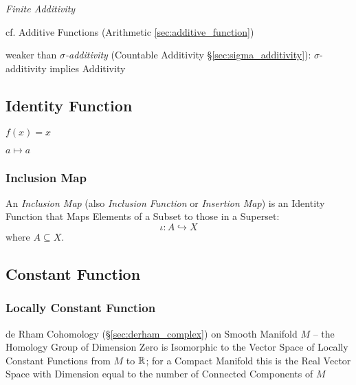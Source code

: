 \emph{Finite Additivity}

cf. Additive Functions (Arithmetic \ref{sec:additive_function})

weaker than \emph{$\sigma$-additivity} (Countable Additivity
\S\ref{sec:sigma_additivity}): $\sigma$-additivity implies Additivity



\subsection{Identity Function}\label{sec:identity_function}

$f(x) = x$

$a \mapsto a$



\subsubsection{Inclusion Map}\label{sec:inclusion_map}

An \emph{Inclusion Map} (also \emph{Inclusion Function} or \emph{Insertion Map})
is an Identity Function that Maps Elements of a Subset to those in a Superset:
\[
  \iota : A \hookrightarrow X
\]
where $A \subseteq X$.



\subsection{Constant Function}\label{sec:constant_function}

\subsubsection{Locally Constant Function}\label{sec:locally_constant}

\fist de Rham Cohomology (\S\ref{sec:derham_complex}) on Smooth Manifold $M$ --
the Homology Group of Dimension Zero is Isomorphic to the Vector Space of
Locally Constant Functions from $M$ to $\mathbb{R}$; for a Compact Manifold this is
the Real Vector Space with Dimension equal to the number of Connected Components
of $M$



